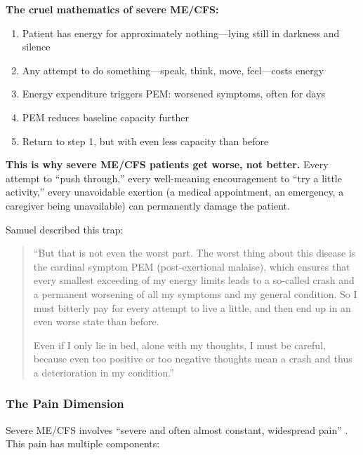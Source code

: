 \begin{tcolorbox}[colback=yellow!5!white,colframe=yellow!75!black,title=The PEM Trap]
\textbf{The cruel mathematics of severe ME/CFS:}

\begin{enumerate}
    \item Patient has energy for approximately nothing---lying still in darkness and silence
    \item Any attempt to do something---speak, think, move, feel---costs energy
    \item Energy expenditure triggers PEM: worsened symptoms, often for days
    \item PEM reduces baseline capacity further
    \item Return to step 1, but with even less capacity than before
\end{enumerate}

\textbf{This is why severe ME/CFS patients get worse, not better.} Every attempt to ``push through,'' every well-meaning encouragement to ``try a little activity,'' every unavoidable exertion (a medical appointment, an emergency, a caregiver being unavailable) can permanently damage the patient.
\end{tcolorbox}

Samuel described this trap:

\begin{quote}
``But that is not even the worst part. The worst thing about this disease is the cardinal symptom PEM (post-exertional malaise), which ensures that every smallest exceeding of my energy limits leads to a so-called crash and a permanent worsening of all my symptoms and my general condition. So I must bitterly pay for every attempt to live a little, and then end up in an even worse state than before.

Even if I only lie in bed, alone with my thoughts, I must be careful, because even too positive or too negative thoughts mean a crash and thus a deterioration in my condition.''
\end{quote}

\subsubsection{The Pain Dimension}
\label{subsec:pain}

Severe ME/CFS involves ``severe and often almost constant, widespread pain'' \cite{Montoya2021severe}. This pain has multiple components:

